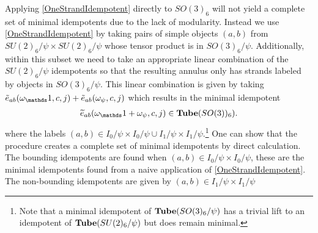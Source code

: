 Applying \eqref{OneStrandIdempotent} directly to $SO(3)_6$ will not yield a complete set of minimal idempotents due to the lack of modularity. 
Instead we use  \eqref{OneStrandIdempotent} by taking pairs of simple objects $(a,b)$ from $SU(2)_6/\psi \times SU(2)_6/\psi$ whose tensor product is in $SO(3)_6/\psi$.
Additionally, within this subset we need to take an appropriate linear combination of the $SU(2)_6/\psi$ idempotents so that the resulting annulus only has strands labeled by objects in $SO(3)_6/\psi$.
This linear combination is given by taking $\tilde{e}_{ab}(\omega_\unit, c,j)+\tilde{e}_{ab}(\omega_\psi, c,j)$ which results in the minimal idempotent
\begin{align}
\widetilde{e}_{ab}( \omega_\unit + \omega_\psi,c,j) \in \tube(SO(3))_6).
\end{align}
where the labels $(a,b) \in I_0/\psi \times I_0/\psi \cup I_1/\psi \times I_1/\psi$.\footnote{
Note that a minimal idempotent of 
$\textbf{Tube}(SO(3)_6/\psi)$ has a trivial lift to an idempotent of $\textbf{Tube}(SU(2)_6/\psi)$ but does  remain minimal.}
One can show that the procedure creates a complete set of minimal idempotents by direct calculation. 
The bounding idempotents are found when $(a,b) \in I_0/\psi \times I_0/\psi$, 
these are the minimal idempotents found from a naive application of \eqref{OneStrandIdempotent}. 
The non-bounding idempotents are given by $(a,b) \in I_1/\psi \times I_1/\psi$



